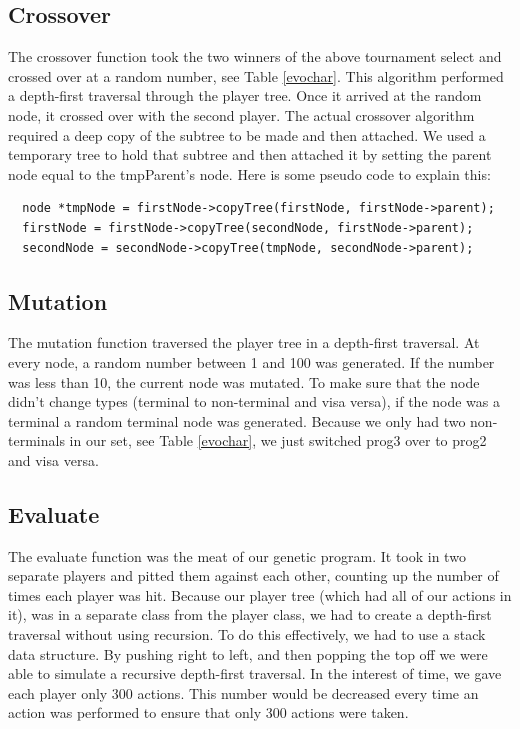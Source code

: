 \documentclass{acm_proc_article-sp}
\begin{document}
\subsection{Crossover}
The crossover function took the two winners of the above tournament select and crossed over at a random number, see Table \ref{evochar}. This algorithm performed a depth-first traversal through the player tree. Once it arrived at the random node, it crossed over with the second player. The actual crossover algorithm required a deep copy of the subtree to be made and then attached. We used a temporary tree to hold that subtree and then attached it by setting the parent node equal to the tmpParent's node. Here is some pseudo code to explain this:
\begin{lstlisting}
  node *tmpNode = firstNode->copyTree(firstNode, firstNode->parent);
  firstNode = firstNode->copyTree(secondNode, firstNode->parent);
  secondNode = secondNode->copyTree(tmpNode, secondNode->parent);
\end{lstlisting}

\subsection{Mutation}
The mutation function traversed the player tree in a depth-first traversal. At every node, a random number between 1 and 100 was generated. If the number was less than 10, the current node was mutated. To make sure that the node didn't change types (terminal to non-terminal and visa versa), if the node was a terminal a random terminal node was generated. Because we only had two non-terminals in our set, see Table \ref{evochar}, we just switched prog3 over to prog2 and visa versa.

\subsection{Evaluate}
The evaluate function was the meat of our genetic program. It took in two separate players and pitted them against each other, counting up the number of times each player was hit. Because our player tree (which had all of our actions in it), was in a separate class from the player class, we had to create a depth-first traversal without using recursion. To do this effectively, we had to use a stack data structure. By pushing right to left, and then popping the top off we were able to simulate a recursive depth-first traversal. In the interest of time, we gave each player only 300 actions. This number would be decreased every time an action was performed to ensure that only 300 actions were taken.
\end{document}
